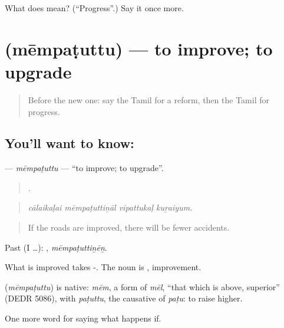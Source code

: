 \begin{tcolorbox}[breakable,colback=teal!4,colframe=teal!35!black,title={Before you move on}]
What does  mean? (\textquotedblleft{}Progress\textquotedblright{}.) Say it once more.
\end{tcolorbox}
\section[\texorpdfstring{\ta{மேம்படுத்து} (mēmpaṭuttu)}{மேம்படுத்து (mēmpaṭuttu)}]{ (mēmpaṭuttu) — to improve; to upgrade}

\label{lesson:TA-C390-mempatuttu}



\begin{quote}
Before the new one: say the Tamil for a reform, then the Tamil for progress.
\end{quote}

\subsection*{You'll want to know: }
\textbf{} — \emph{mēmpaṭuttu} — \textquotedblleft{}to improve; to upgrade\textquotedblright{}.

\begin{quote}
   .
\end{quote}

\begin{quote}
\emph{cālaikaḷai mēmpaṭuttiṉāl vipattukaḷ kuṟaiyum.}
\end{quote}

\begin{quote}
If the roads are improved, there will be fewer accidents.
\end{quote}

Past (I …): , \emph{mēmpaṭuttiṉēṉ}.

What is improved takes -. The noun is , improvement.

\begin{cousinweb}
\textbf{} (\emph{mēmpaṭuttu}) is native: \emph{mēm}, a form of \emph{mēl}, \textquotedblleft{}that which is above, superior\textquotedblright{} (DEDR 5086), with \emph{paṭuttu}, the causative of \emph{paṭu}: to raise higher.
\end{cousinweb}

\begin{grammarlens}[title={What you've built}]
One more word for saying what happens if.
\end{grammarlens}


